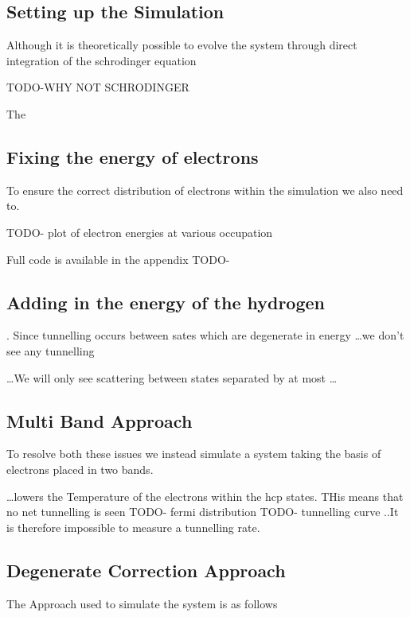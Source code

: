 
\subsection{Setting up the Simulation}

Although it is theoretically possible
to evolve the system through direct
integration of the schrodinger equation

TODO-WHY NOT SCHRODINGER

The

\subsection{Fixing the energy of electrons}

To ensure the correct distribution of electrons
within the simulation we also need to.

TODO- plot of electron energies at various occupation

Full code is available in the appendix TODO-

\subsection{}

\subsection{Adding in the energy of the hydrogen}

. Since tunnelling occurs between sates which are
degenerate in energy \ldots we don't see any tunnelling


\ldots We will only see scattering between
states separated by at most \ldots

\subsection{Multi Band Approach}
To resolve both these issues we instead simulate a system
taking the basis of electrons placed in two bands.

\ldots lowers the Temperature of the electrons within
the hcp states. THis means that no net tunnelling is seen
TODO- fermi distribution
TODO- tunnelling curve
..It is therefore impossible to measure a tunnelling
rate.

\subsection{Degenerate Correction Approach}
The Approach used to simulate the system is as follows